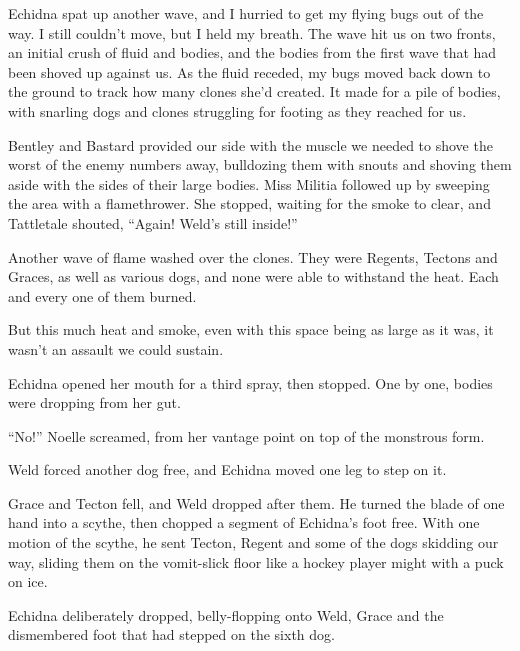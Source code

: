 Echidna spat up another wave, and I hurried to get my flying bugs out of the way.  I still couldn't move, but I held my breath.  The wave hit us on two fronts, an initial crush of fluid and bodies, and the bodies from the first wave that had been shoved up against us.  As the fluid receded, my bugs moved back down to the ground to track how many clones she'd created.  It made for a pile of bodies, with snarling dogs and clones struggling for footing as they reached for us.



Bentley and Bastard provided our side with the muscle we needed to shove the worst of the enemy numbers away, bulldozing them with snouts and shoving them aside with the sides of their large bodies.  Miss Militia followed up by sweeping the area with a flamethrower.  She stopped, waiting for the smoke to clear, and Tattletale shouted, ``Again!  Weld's still inside!''



Another wave of flame washed over the clones.  They were Regents, Tectons and Graces, as well as various dogs, and none were able to withstand the heat.  Each and every one of them burned.



But this much heat and smoke, even with this space being as large as it was, it wasn't an assault we could sustain.



Echidna opened her mouth for a third spray, then stopped.  One by one, bodies were dropping from her gut.



``No!''  Noelle screamed, from her vantage point on top of the monstrous form.



Weld forced another dog free, and Echidna moved one leg to step on it.



Grace and Tecton fell, and Weld dropped after them.  He turned the blade of one hand into a scythe, then chopped a segment of Echidna's foot free.  With one motion of the scythe, he sent Tecton, Regent and some of the dogs skidding our way, sliding them on the vomit-slick floor like a hockey player might with a puck on ice.



Echidna deliberately dropped, belly-flopping onto Weld, Grace and the dismembered foot that had stepped on the sixth dog.



